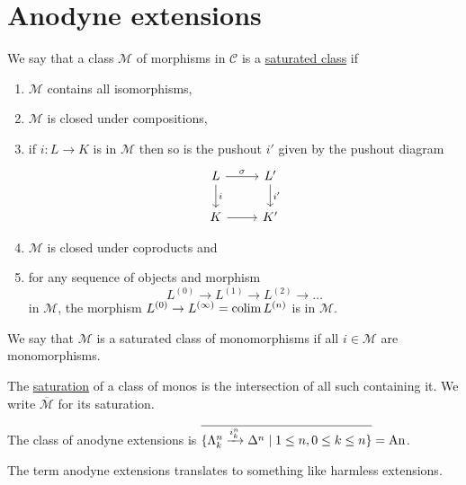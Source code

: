 \section{Anodyne extensions}

\begin{defi}
    We say that a class $\mathcal{M}$ of morphisms in $\mathcal{C}$ is a \underline{saturated class} if 
    \begin{enumerate}
        \item 
        $\mathcal{M}$ contains all isomorphisms,
        \item 
        $\mathcal{M}$ is closed under compositions,
        \item
        if $i:L \to K$ is in $\mathcal{M}$ then so is the pushout $i'$ given by the pushout diagram 
        \[
        \begin{tikzcd}
            L
            \arrow[d,"i"]
            \ar[r,"\sigma"]
            &
            L'
            \ar[d,"i'"]
            \\
            K
            \ar[r]
            &
            K'   
        \end{tikzcd}
        \]
        \item
        $\mathcal{M}$ is closed under coproducts and
        \item 
        for any sequence of objects and morphism 
        \[
        L^{(0)} \to L^{(1)} \to L^{(2)}\to \dotsc
        \]
        in $\mathcal{M}$, the morphism $L^{(0)} \to L^{(\infty)}=\operatorname{colim} L^{(n)}$ is in $\mathcal{M}$.
    \end{enumerate}
    We say that $\mathcal{M}$ is a saturated class of monomorphisms if all $i \in \mathcal{M}$ are monomorphisms.
\end{defi}

\begin{defi}
    The \underline{saturation} of a class of monos is the intersection of all such containing it. We write $\overline{\mathcal{M}}$ for its saturation.
\end{defi}

\begin{defi}
    The class of anodyne extensions is $\overline{\{ \Lambda_k^n \xrightarrow{i_k^n} \Delta^n \mid 1 \leq n ,0 \leq k \leq n \}}=\operatorname{An}$.
\end{defi}

\begin{rmk}
    The term anodyne extensions translates to something like harmless extensions.
\end{rmk}

